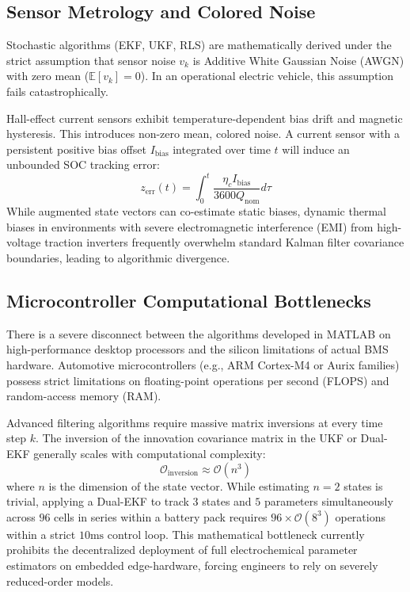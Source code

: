 \subsection{Sensor Metrology and Colored Noise}
\label{subsec:sensor_challenges}

Stochastic algorithms (EKF, UKF, RLS) are mathematically derived under the strict assumption that sensor noise $v_k$ is Additive White Gaussian Noise (AWGN) with zero mean ($\mathbb{E}[v_k] = 0$). In an operational electric vehicle, this assumption fails catastrophically. 

Hall-effect current sensors exhibit temperature-dependent bias drift and magnetic hysteresis. This introduces non-zero mean, colored noise. A current sensor with a persistent positive bias offset $I_{\mathrm{bias}}$ integrated over time $t$ will induce an unbounded SOC tracking error:
\begin{equation}
\label{eq:current_bias_error}
z_{\mathrm{err}}(t) = \int_0^t \frac{\eta_c I_{\mathrm{bias}}}{3600 Q_{\mathrm{nom}}} d\tau
\end{equation}
While augmented state vectors can co-estimate static biases, dynamic thermal biases in environments with severe electromagnetic interference (EMI) from high-voltage traction inverters frequently overwhelm standard Kalman filter covariance boundaries, leading to algorithmic divergence.

\subsection{Microcontroller Computational Bottlenecks}
\label{subsec:microcontroller_bottlenecks}

There is a severe disconnect between the algorithms developed in MATLAB on high-performance desktop processors and the silicon limitations of actual BMS hardware. Automotive microcontrollers (e.g., ARM Cortex-M4 or Aurix families) possess strict limitations on floating-point operations per second (FLOPS) and random-access memory (RAM).

Advanced filtering algorithms require massive matrix inversions at every time step $k$. The inversion of the innovation covariance matrix in the UKF or Dual-EKF generally scales with computational complexity:
\begin{equation}
\label{eq:big_o_complexity}
\mathcal{O}_{\mathrm{inversion}} \approx \mathcal{O}(n^3)
\end{equation}
where $n$ is the dimension of the state vector. While estimating $n=2$ states is trivial, applying a Dual-EKF to track $3$ states and $5$ parameters simultaneously across $96$ cells in series within a battery pack requires $96 \times \mathcal{O}(8^3)$ operations within a strict $10\mathrm{ms}$ control loop. This mathematical bottleneck currently prohibits the decentralized deployment of full electrochemical parameter estimators on embedded edge-hardware, forcing engineers to rely on severely reduced-order models.

